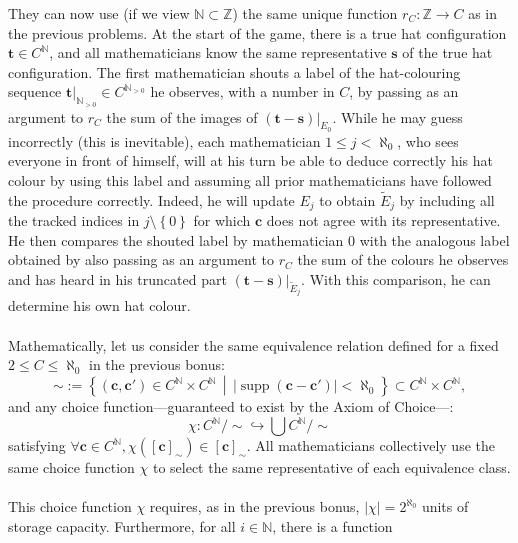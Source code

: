 \documentclass[11pt, a4paper, oneside]{article}
\theoremstyle{remark}
\theoremstyle{lemma}
\begin{document}
They can now use (if we view \( \mathbb{N} \subset \mathbb{Z} \)) the same unique function \( r_C \colon \mathbb{Z} \rightarrow C \) as in the previous problems. At the start of the game, there is a true hat configuration \( \mathbf{t} \in C^{\mathbb{N}} \), and all mathematicians know the same representative \( \mathbf{s} \) of the true hat configuration. The first mathematician shouts a label of the hat-colouring sequence \( \left. \mathbf{t} \right|_{\mathbb{N}_{>0}} \in C^{\mathbb{N}_{>0}} \) he observes, with a number in \( C \), by passing as an argument to \( r_C \) the sum of the images of \( \left. \left( \mathbf{t} - \mathbf{s} \right) \right|_{E_0} \). While he may guess incorrectly (this is inevitable), each mathematician \( 1 \leq j < \aleph_0 \), who sees everyone in front of himself, will at his turn be able to deduce correctly his hat colour by using this label and assuming all prior mathematicians have followed the procedure correctly. Indeed, he will update \( E_j \) to obtain \( \tilde{E}_j \) by including all the tracked indices in \( j \setminus \left\{ 0 \right\} \) for which \( \mathbf{c} \) does not agree with its representative. He then compares the shouted label by mathematician \( 0 \) with the analogous label obtained by also passing as an argument to \( r_C \) the sum of the colours he observes and has heard in his truncated part \( \left. \left( \mathbf{t} - \mathbf{s} \right) \right|_{\tilde{E}_j} \). With this comparison, he can determine his own hat colour.
\\\\
Mathematically, let us consider the same equivalence relation defined for a fixed \( 2 \leq C \leq \aleph_0 \) in the previous bonus:
\[
\sim := \left\{ \left( \mathbf{c}, \mathbf{c}' \right) \in C^{\mathbb{N}} \times C^{\mathbb{N}} \,\middle|\, \left| \operatorname{supp} \left( \mathbf{c} - \mathbf{c}' \right) \right| < \aleph_0 \right\} \subset C^{\mathbb{N}} \times C^{\mathbb{N}},
\]
and any choice function—guaranteed to exist by the Axiom of Choice—:
\[
\chi \colon C^{\mathbb{N}} / {\sim} \hookrightarrow \bigcup C^{\mathbb{N}} / {\sim}
\]
satisfying \( \forall \mathbf{c} \in C^{\mathbb{N}}, \chi\left( \left[ \mathbf{c} \right]_{\sim} \right) \in \left[ \mathbf{c} \right]_{\sim} \). All mathematicians collectively use the same choice function \( \chi \) to select the same representative of each equivalence class.
\\\\
This choice function \(\chi\) requires, as in the previous bonus, \(\left|\chi\right| = 2^{\aleph_0}\) units of storage capacity. Furthermore, for all \( i \in \mathbb{N} \), there is a function
\end{document}
